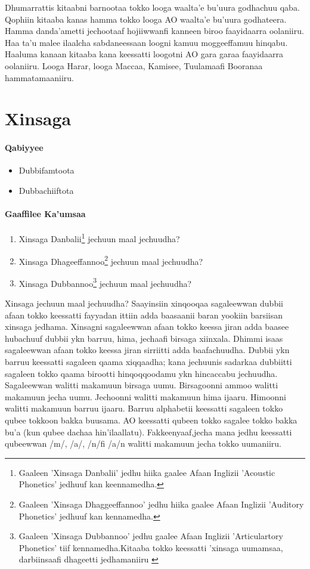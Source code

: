 \documentclass[11pt,b5paper]{book}
\begin{document}
Dhumarrattis kitaabni barnootaa tokko looga waalta’e bu’uura godhachuu qaba. Qophiin kitaaba kanas hamma tokko looga AO waalta’e bu’uura godhateera. Hamma danda’ametti
jechootaaf hojiiwwan\cite{aadaa1995}fi kanneen biroo faayidaarra oolaniiru. Haa ta’u malee ilaalcha sabdaneessaan loogni kamuu moggeeffamuu hinqabu. Haaluma kanaan
kitaaba kana keessatti loogotni AO gara garaa faayidaarra oolaniiru. Looga Harar, looga Maccaa, Kamisee, Tuulamaafi Booranaa hammatamaaniiru\cite{biniyam1988,griefenow2001grammatical,kebede1994}.


\chapter{Xinsaga}
\setlength{\parindent}{3em}
\subsubsection{Qabiyyee}
\begin{itemize}
  \item Dubbifamtoota
  \item Dubbachiiftota
\end{itemize}

\subsubsection{Gaaffilee Ka'umsaa}
\begin{enumerate}
  \item Xinsaga Danbalii\footnote{Gaaleen 'Xinsaga Danbalii' jedhu hiika gaalee Afaan Inglizii 'Acoustic Phonetics' jedhuuf kan keennamedha.} jechuun maal jechuudha?
  \item Xinsaga Dhageeffannoo\footnote{Gaaleen 'Xinsaga Dhaggeeffannoo' jedhu hiika gaalee Afaan Inglizii 'Auditory Phonetics' jedhuuf kan kennamedha.} jechuun maal jechuudha?
  \item Xinsaga Dubbannoo\footnote{Gaaleen 'Xinsaga Dubbannoo' jedhu gaalee Afaan Inglizii 'Articulartory Phonetics' tiif kennamedha.Kitaaba tokko keessatti 'xinsaga uumamsaa, darbiinsaafi dhageetti jedhamaniiru \cite[p.39]{Addunya2018}} jechuun maal jechuudha?
\end{enumerate}

Xinsaga jechuun maal jechuudha? Saayinsiin xinqooqaa sagaleewwan dubbii afaan tokko keessatti fayyadan ittiin adda baasaanii baran yookiin barsiisan xinsaga jedhama. Xinsagni sagaleewwan afaan tokko keessa jiran adda baasee hubachuuf dubbii ykn barruu, hima, jechaafi birsaga xiinxala. Dhimmi isaas sagaleewwan afaan tokko keessa jiran sirriitti adda baafachuudha. Dubbii ykn barruu keessatti sagaleen qaama xiqqaadha; kana jechuunis sadarkaa dubbiitti sagaleen tokko qaama birootti hinqoqqoodamu ykn hincaccabu jechuudha. Sagaleewwan walitti makamuun birsaga uumu. Birsagoonni ammoo walitti makamuun jecha uumu. Jechoonni walitti makamuun hima ijaaru. Himoonni walitti makamuun barruu ijaaru. Barruu alphabetii keessatti sagaleen tokko qubee tokkoon bakka buusama. AO keessatti qubeen tokko sagalee tokko bakka bu’a (kun qubee dachaa hin’ilaallatu). Fakkeenyaaf,jecha mana jedhu keessatti qubeewwan /m/, /a/, /n/fi /a/n walitti makamuun jecha tokko uumaniiru.
\end{document}
